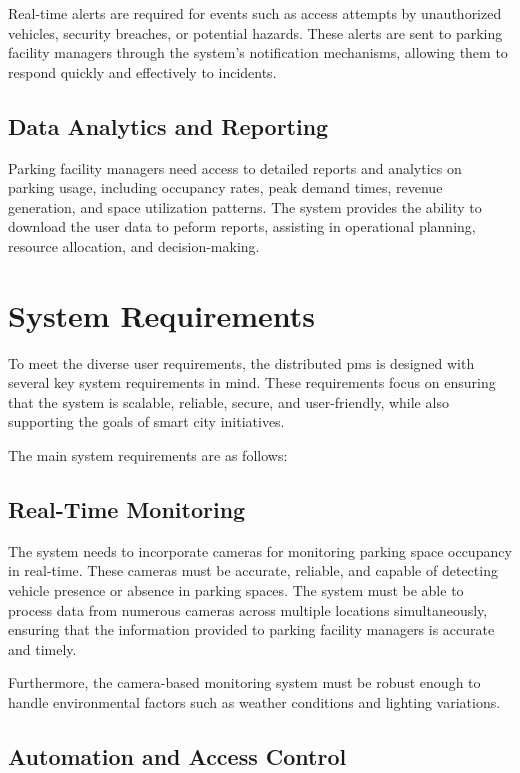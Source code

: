 Real-time alerts are required for events such as access attempts by unauthorized vehicles, security breaches, or potential hazards. These alerts are sent to parking facility managers through the system's notification mechanisms, allowing them to respond quickly and effectively to incidents.

\subsection{Data Analytics and Reporting}

Parking facility managers need access to detailed reports and analytics on parking usage, including occupancy rates, peak demand times, revenue generation, and space utilization patterns. The system provides the ability to download the user data to peform reports, assisting in operational planning, resource allocation, and decision-making.

\section{System Requirements}\label{sec:system_requirements}

To meet the diverse user requirements, the distributed \gls{pms} is designed with several key system requirements in mind. These requirements focus on ensuring that the system is scalable, reliable, secure, and user-friendly, while also supporting the goals of smart city initiatives.

The main system requirements are as follows:

\subsection{Real-Time Monitoring}

The system needs to incorporate cameras for monitoring parking space occupancy in real-time. These cameras must be accurate, reliable, and capable of detecting vehicle presence or absence in parking spaces. The system must be able to process data from numerous cameras across multiple locations simultaneously, ensuring that the information provided to parking facility managers is accurate and timely.

Furthermore, the camera-based monitoring system must be robust enough to handle environmental factors such as weather conditions and lighting variations.

\subsection{Automation and Access Control}

